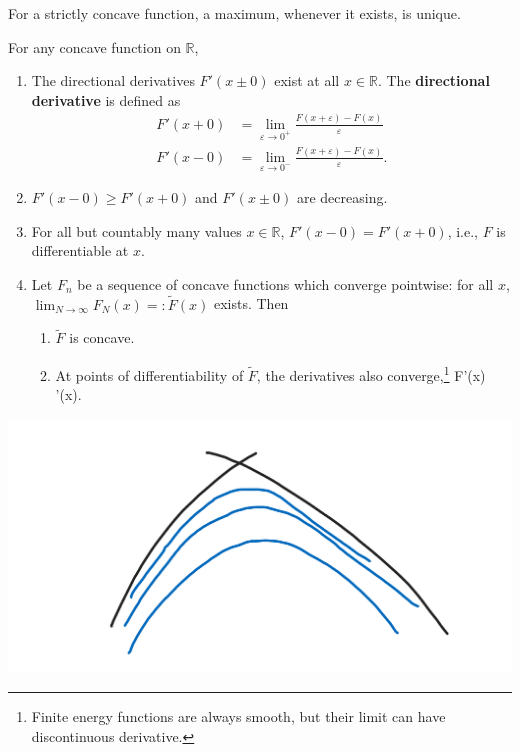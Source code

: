 \documentclass[12pt]{book}
\theoremstyle{norm}
\begin{document}
For a strictly concave function, a maximum, whenever it exists, is unique.

\begin{theorem}
For any concave function on $\mathbb{R}$, 
\begin{enumerate}
\item
The directional derivatives $F'(x\pm0)$ exist at all $x\in \mathbb{R}$. The \textbf{directional derivative} is defined as
\begin{align*}
F'(x+0)&=\lim_{\varepsilon\to 0^+} \frac{F(x+\varepsilon)-F(x)}{\varepsilon}\\
F'(x-0)&=\lim_{\varepsilon\to 0^-} \frac{F(x+\varepsilon)-F(x)}{\varepsilon}.
\end{align*}
\item $F'(x-0)\ge F'(x+0)$ and $F'(x\pm 0)$ are decreasing.
\item For all but countably many values $x\in \mathbb{R}$, $F'(x-0)=F'(x+0)$, i.e., $F$ is differentiable at $x$.
\item Let $F_n$ be a sequence of concave functions which converge pointwise: for all $x$, $\lim_{N\to \infty} F_N(x)=:\widetilde{F}(x)$ exists. 
Then
\begin{enumerate}
\item
 $\widetilde{F}$ is concave.
\item
At points of differentiability of $\widetilde{F}$, the derivatives also converge,\footnote{Finite energy functions are always smooth, but %
their limit can have discontinuous derivative.
}
\be
F'(x) \to {}'(x).
\ee
\end{enumerate}
\end{enumerate}
\end{theorem}

\begin{center}\includegraphics[scale=.25]{images/2-3}\end{center}
\end{document}
